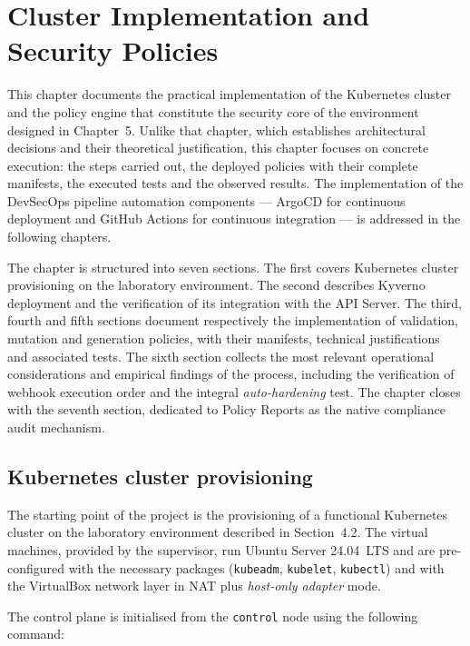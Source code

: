 \chapter{Cluster Implementation and Security Policies}

This chapter documents the practical implementation of the Kubernetes cluster and the policy engine that constitute the security core of the environment designed in Chapter~5. Unlike that chapter, which establishes architectural decisions and their theoretical justification, this chapter focuses on concrete execution: the steps carried out, the deployed policies with their complete manifests, the executed tests and the observed results. The implementation of the DevSecOps pipeline automation components --- ArgoCD for continuous deployment and GitHub Actions for continuous integration --- is addressed in the following chapters.

The chapter is structured into seven sections. The first covers Kubernetes cluster provisioning on the laboratory environment. The second describes Kyverno deployment and the verification of its integration with the API Server. The third, fourth and fifth sections document respectively the implementation of validation, mutation and generation policies, with their manifests, technical justifications and associated tests. The sixth section collects the most relevant operational considerations and empirical findings of the process, including the verification of webhook execution order and the integral \textit{auto-hardening} test. The chapter closes with the seventh section, dedicated to Policy Reports as the native compliance audit mechanism.

\section{Kubernetes cluster provisioning}

The starting point of the project is the provisioning of a functional Kubernetes cluster on the laboratory environment described in Section~4.2. The virtual machines, provided by the supervisor, run Ubuntu Server 24.04~LTS and are pre-configured with the necessary packages (\texttt{kubeadm}, \texttt{kubelet}, \texttt{kubectl}) and with the VirtualBox network layer in NAT plus \textit{host-only adapter} mode.

The control plane is initialised from the \texttt{control} node using the following command:

